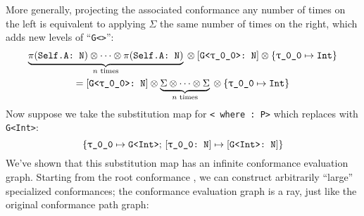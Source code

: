 \documentclass[../generics]{subfiles}
\begin{document}
More generally, projecting the associated conformance any number of times on the left is equivalent to applying $\Sigma$ the same number of times on the right, which adds new levels of ``\texttt{G<>}'':
\begin{gather*}
\underbrace{\pi(\texttt{Self.A:~N})\otimes\cdots\otimes\pi(\texttt{Self.A:~N})}_{\textrm{$n$ times}}{} \otimes[\texttt{G<\texttt{$\uptau$\_0\_0}>:~N}]\otimes \{\texttt{\texttt{$\uptau$\_0\_0}} \mapsto \texttt{Int}\}\\
= [\texttt{G<\texttt{$\uptau$\_0\_0}>:~N}]\otimes \underbrace{\Sigma\otimes\cdots\otimes \Sigma}_{\textrm{$n$ times}}{} \otimes \{\texttt{\texttt{$\uptau$\_0\_0}} \mapsto \texttt{Int}\}
\end{gather*}
Now suppose we take the substitution map for \texttt{< where :\ P>} which replaces  with \texttt{G<Int>}:
\[\{\texttt{\texttt{$\uptau$\_0\_0}} \mapsto \texttt{G<Int>};\,[\texttt{\texttt{$\uptau$\_0\_0}:~N}] \mapsto [\texttt{G<Int>:~N}]\}\]
We've shown that this substitution map has an infinite conformance evaluation graph. Starting from the root conformance , we can construct arbitrarily ``large'' specialized conformances; the conformance evaluation graph is a ray, just like the original conformance path graph:
\begin{quote}
\end{quote}
\end{document}
